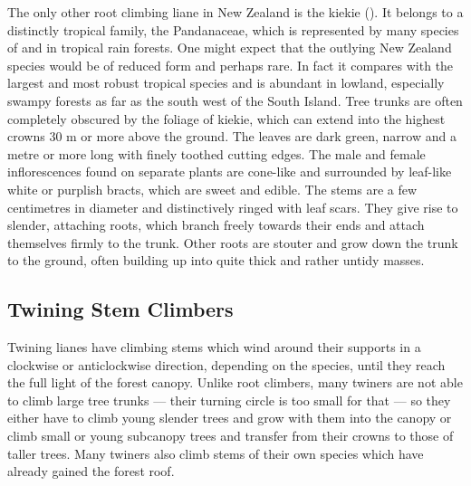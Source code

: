 The only other root climbing liane in New Zealand is the kiekie ().
It belongs to a distinctly tropical family, the Pandanaceae, which is represented by many species of  and  in tropical rain forests.
One might expect that the outlying New Zealand species would be of reduced form and perhaps rare.
In fact it compares with the largest and most robust tropical species and is abundant in lowland, especially swampy forests as far as the south west of the South Island.
Tree trunks are often completely obscured by the foliage of kiekie, which can extend into the highest crowns 30 m or more above the ground.
The leaves are dark green, narrow and a metre or more long with finely toothed cutting edges.
The male and female inflorescences found on separate plants are cone-like and surrounded by leaf-like white or purplish bracts, which are sweet and edible.
The stems are a few centimetres in diameter and distinctively ringed with leaf scars.
They give rise to slender, attaching roots, which branch freely towards their ends and attach themselves firmly to the trunk.
Other roots are stouter and grow down the trunk to the ground, often building up into quite thick and rather untidy masses.

\subsection{Twining Stem Climbers}

Twining lianes have climbing stems which wind around their supports in a clockwise or anticlockwise direction, depending on the species, until they reach the full light of the forest canopy.
Unlike root climbers, many twiners are not able to climb large tree trunks --- their turning circle is too small for that --- so they either have to climb young slender trees and grow with them into the canopy or climb small or young subcanopy trees and transfer from their crowns to those of taller trees.
Many twiners also climb stems of their own species which have already gained the forest roof.


